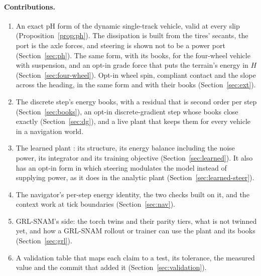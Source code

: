 \documentclass[11pt]{article}
\theoremstyle{remark}
\begin{document}
\paragraph{Contributions.}
\begin{enumerate}
  \item An exact pH form of the dynamic single-track vehicle, valid at every slip
        (Proposition~\ref{prop:ph}). The dissipation is built from the tires' secants, the port
        is the axle forces, and steering is shown not to be a power port
        (Section~\ref{sec:ph}). The same form, with its books, for the four-wheel vehicle with
        suspension, and an opt-in grade force that puts the terrain's energy in $H$
        (Section~\ref{sec:four-wheel}). Opt-in wheel spin, compliant contact and the slope across
        the heading, in the same form and with their books (Section~\ref{sec:ext}).
  \item The discrete step's energy books, with a residual that is second order per step
        (Section~\ref{sec:books}), an opt-in discrete-gradient step whose books close exactly
        (Section~\ref{sec:dg}), and a live plant that keeps them for every vehicle in a
        navigation world.
  \item The learned plant : its structure, its energy balance including the noise
        power, its integrator and its training objective (Section~\ref{sec:learned}). It also has an
        opt-in form in which steering modulates the model instead of supplying power, as it does in
        the analytic plant (Section~\ref{sec:learned-steer}).
  \item The navigator's per-step energy identity, the two checks built on it, and the context
        work at tick boundaries (Section~\ref{sec:nav}).
  \item GRL-SNAM's side: the torch twins and their parity tiers, what is not twinned yet, and how
        a GRL-SNAM rollout or trainer can use the plant and its books (Section~\ref{sec:grl}).
  \item A validation table that maps each claim to a test, its tolerance, the measured value and
        the commit that added it (Section~\ref{sec:validation}).
\end{enumerate}
\end{document}
